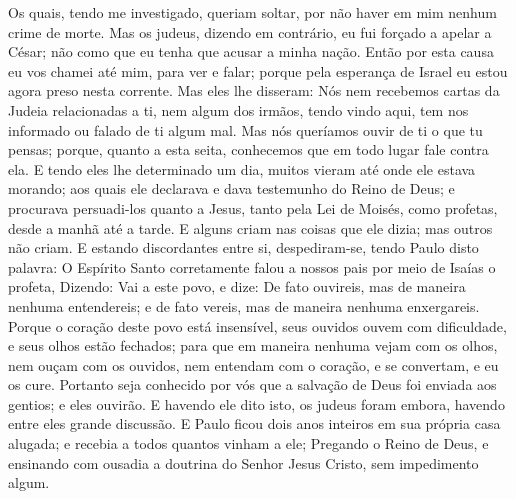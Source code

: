 {Os quais, tendo me investigado, queriam
{} soltar, por não haver em mim nenhum crime de morte.
Mas os judeus, dizendo em contrário, eu fui forçado a apelar a César;
{} não como que eu tenha que acusar a minha nação.
Então por esta causa eu vos chamei até mim, para
{} ver e falar; porque pela esperança de Israel eu estou agora preso nesta corrente.
Mas eles lhe disseram: Nós nem recebemos cartas da Judeia relacionadas a ti, nem algum dos irmãos, tendo vindo aqui, tem nos informado ou falado de ti algum mal.
Mas nós queríamos ouvir de ti o que tu pensas; porque, quanto a esta seita, conhecemos que em todo lugar
{} fale contra ela.
E tendo eles lhe determinado um dia, muitos vieram até onde ele estava morando; aos quais ele declarava e dava testemunho do Reino de Deus; e procurava persuadi-los quanto a Jesus, tanto pela Lei de Moisés, como
{} profetas, desde a manhã até a tarde.
E alguns criam nas coisas que ele dizia; mas outros não criam.
E estando discordantes entre si, despediram-se, tendo Paulo disto
{} palavra: O Espírito Santo corretamente falou a nossos pais por meio de Isaías o profeta,
Dizendo: Vai a este povo, e dize: De fato ouvireis, mas de maneira nenhuma entendereis; e de fato vereis, mas de maneira nenhuma enxergareis.
Porque o coração deste povo está insensível, seus ouvidos ouvem com dificuldade, e seus olhos estão fechados; para que em maneira nenhuma vejam com os olhos, nem ouçam com os ouvidos, nem entendam com o coração, e se convertam, e eu os cure.
Portanto seja conhecido por vós que a salvação de Deus foi enviada aos gentios; e eles
{} ouvirão.
E havendo ele dito isto, os judeus foram embora, havendo entre eles grande discussão.
E Paulo ficou dois anos inteiros em sua própria casa alugada; e recebia a todos quantos vinham a ele;
Pregando o Reino de Deus, e ensinando com ousadia a doutrina do Senhor Jesus Cristo, sem impedimento algum.\par }
